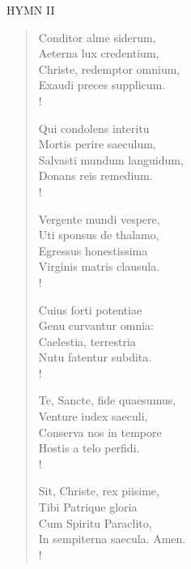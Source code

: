 \noindent\small{\uppercase{Hymn II}}\normalsize \label{advent:lastHymn}
\begin{verse}
Conditor alme siderum,\\
Aeterna lux credentium,\\
Christe, redemptor omnium,\\
Exaudi preces supplicum.\\!

Qui condolens interitu\\
Mortis perire saeculum,\\
Salvasti mundum languidum,\\
Donans reis remedium.\\!

Vergente mundi vespere,\\
Uti sponsus de thalamo,\\
Egressus honestissima\\
Virginis matris clausula.\\!

Cuius forti potentiae\\
Genu curvantur omnia:\\
Caelestia, terrestria\\
Nutu fatentur subdita.\\!

Te, Sancte, fide quaesumus,\\
Venture iudex saeculi,\\
Conserva nos in tempore\\
Hostis a telo perfidi.\\!

Sit, Christe, rex piisime,\\
Tibi Patrique gloria\\
Cum Spiritu Paraclito,\\
In sempiterna saecula. Amen.\\!
\end{verse}

